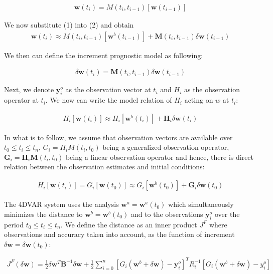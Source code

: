 \documentclass[a4,12pt]{article}
\numberwithin{equation}{section}
\begin{document}
\begin{align}
\mathbf {w}(t_{i})=M(t_{i},t_{i-1})[\mathbf {w}(t_{i-1})]
\end{align}

We now substitute (1) into (2) and obtain 
\begin{align}
\mathbf {w}(t_{i}) \approx M(t_{i},t_{i-1})[\mathbf {w}^{b}(t_{i-1})] + \mathbf {M}(t_{i},t_{i-1})\delta \mathbf {w}(t_{i-1})
\end{align}

We then can define the increment prognostic model as following:

\begin{align}
\delta \mathbf {w}(t_{i}) = \mathbf {M}(t_{i},t_{i-1})\delta \mathbf {w}(t_{i-1})
\end{align}

Next, we denote $\mathbf {y}_{i}^{o}$ as the observation vector at $t_{i}$ and $H_{i}$ as the observation operator at $t_{i}$. We now can write the model relation of $H_{i}$ acting on $w$ at $t_{i}$:

\begin{align}
H_{i}[\mathbf {w}(t_{i})] \approx H_{i}[\mathbf {w}^{b}(t_{i})]+\mathbf {H}_{i}\delta \mathbf {w}(t_{i})
\end{align}

In what is to follow, we assume that observation vectors are available over $t_{0}\leq t_{i} \leq t_{n}$, $G_{i} = H_{i}M(t_{i},t_{0})$ being a generalized observation operator, $\mathbf {G}_{i} = \mathbf {H}_{i}\mathbf {M}(t_{i},t_{0})$ being a linear observation operator and hence, there is direct relation between the observation estimates and initial conditions:

\begin{align}
H_{i}[\mathbf {w}(t_{i})]=G_{i}[\mathbf {w}(t_{0})] \approx G_{i}[\mathbf {w}^{b}(t_{0})] + \mathbf {G}_{i}\delta \mathbf {w}(t_{0})
\end{align}

The 4DVAR system uses the analysis $\mathbf {w}^{a}=\mathbf {w}^{a}(t_{0})$ which simultaneously minimizes the distance to $\mathbf {w}^{b} = \mathbf {w}^{b}(t_{0})$ and to the observations $\mathbf {y}_{i}^{o}$ over the period $t_{0}\leq t_{i} \leq t_{n}$. We define the distance as an inner product $J^{F}$ where observations and accuracy taken into account, as the function of increment $\delta \mathbf {w} = \delta \mathbf {w}(t_{0})$:

\begin{align}
J^{F}(\delta \mathbf {w}) = \frac{1}{2} \delta \mathbf {w}^{T} \mathbf {B}^{-1} \delta \mathbf {w} + \frac{1}{2} \sum_{i=0}^{n}[G_{i}(\mathbf {w}^{b}+\delta \mathbf {w})-\mathbf {y}_{i}^{o}]^{T}R_{i}^{-1}[G_{i}(\mathbf {w}^{b} + \delta \mathbf {w}) - y_{i}^{o}]
\end{align}
\end{document}
